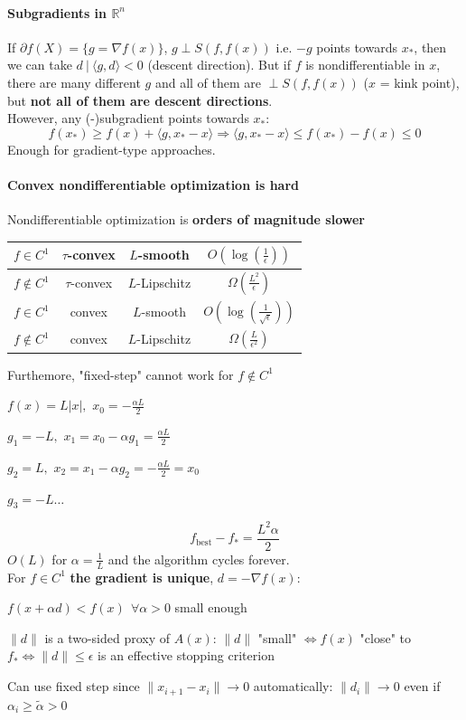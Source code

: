 \documentclass[10pt]{report}
\begin{document}
\paragraph{Subgradients in $\mathbb{R}^n$} If $\partial f(X) = \{g=\nabla f(x)\}$, $g\perp S(f,f(x))$ i.e. $-g$ points towards $x_*$, then we can take $d\:|\:\langle g,d\rangle < 0$ (descent direction). But if $f$ is nondifferentiable in $x$, there are many different $g$ and all of them are $\perp S(f,f(x))$ ($x$ = kink point), but \textbf{not all of them are descent directions}.\\
However, any (-)subgradient points towards $x_*$:
$$f(x_*)\geq f(x)+\langle g,x_*-x\rangle\Rightarrow \langle g,x_*-x\rangle\leq f(x_*)-f(x)\leq 0$$
Enough for gradient-type approaches.
\paragraph{Convex nondifferentiable optimization is hard} Nondifferentiable optimization is \textbf{orders of magnitude slower}
\begin{center}
	\begin{tabular}{c | c | c | c}
	$f\in C^1$&$\tau$-convex&$L$-smooth&$O\left(\log\left(\frac{1}{\epsilon}\right)\right)$\\
	\hline
	$f\not\in C^1$&$\tau$-convex&$L$-Lipschitz&$\Omega\left(\frac{L^2}{\epsilon}\right)$\\
	\hline
	$f\in C^1$&convex&$L$-smooth&$O\left(\log\left(\frac{1}{\sqrt{\epsilon}}\right)\right)$\\
	\hline
	$f\not\in C^1$&convex&$L$-Lipschitz&$\Omega\left(\frac{L}{\epsilon^2}\right)$
	\end{tabular}
\end{center}
Furthemore, "fixed-step" cannot work for $f\not\in C^1$
\begin{list}{}{}
	\item $f(x) = L|x|,$ $x_0 =-\frac{\alpha L}{2}$
	\item $g_1 = -L,$ $x_1 = x_0 - \alpha g_1 = \frac{\alpha L}{2}$
	\item $g_2 = L,$ $x_2 = x_1 - \alpha g_2 = -\frac{\alpha L}{2} = x_0$
	\item $g_3 = -L\ldots$
\end{list}
$$f_{\text{best}} - f_* = \frac{L^2\alpha}{2}$$
$O(L)$ for $\alpha=\frac{1}{L}$ and the algorithm cycles forever.\\
For $f\in C^1$ \textbf{the gradient is unique}, $d=-\nabla f(x)$:
\begin{list}{}{}
	\item $f(x+\alpha d) < f(x)\:\:\forall\alpha > 0$ small enough
	\item $\|d\|$ is a two-sided proxy of $A(x)$: $\|d\|$ "small" $\Leftrightarrow f(x)$ "close" to $f_*\Leftrightarrow \|d\|\leq \epsilon$ is an effective stopping criterion
	\item Can use fixed step since $\|x_{i+1}-x_i\|\rightarrow 0$ automatically: $\|d_i\|\rightarrow 0$ even if $\alpha_i \geq \tilde{\alpha} > 0$
\end{list}
\end{document}
